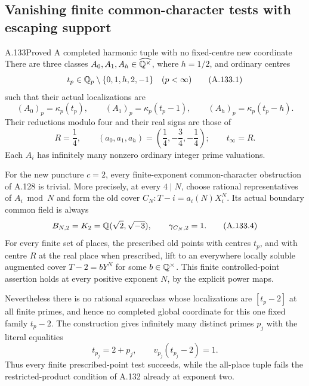 \subsection{Vanishing finite common-character tests with escaping support}

\begin{statement}{A.133}{Proved}
{A completed harmonic tuple with no fixed-centre new coordinate}
There are three classes \(A_0,A_1,A_h\in\widehat{\mathbb Q^\times}\),
where \(h=1/2\), and ordinary centres
\[
 t_p\in\mathbb Q_p\setminus\{0,1,h,2,-1\}
                         \quad(p<\infty)
\tag{A.133.1}
\]
such that their actual localizations are
\[
 (A_0)_p=\kappa_p(t_p),\qquad
 (A_1)_p=\kappa_p(t_p-1),\qquad
 (A_h)_p=\kappa_p(t_p-h).
\tag{A.133.2}
\]
Their reductions modulo four and their real signs are
those of
\[
       R=\frac14,\qquad
       (a_0,a_1,a_h)=\left(\frac14,-\frac34,-\frac14\right);
                  \qquad t_\infty=R.
\tag{A.133.3}
\]
Each \(A_i\) has infinitely many nonzero ordinary integer
prime valuations.

For the new puncture \(c=2\), every finite-exponent
common-character obstruction of A.128 is trivial.
More precisely, at every \(4\mid N\), choose rational
representatives of \(A_i\bmod N\) and form the old cover
\(C_N:T-i=a_i(N)X_i^N\).
Its actual boundary common field is always
\[
                  B_{N,2}=K_2=\mathbb Q(\sqrt2,\sqrt{-3}),
                    \qquad \gamma_{C_N,2}=1.
\tag{A.133.4}
\]
For every finite set of places, the prescribed old
points with centres \(t_p\), and with centre \(R\) at
the real place when prescribed, lift to an everywhere
locally soluble augmented cover
\(T-2=bY^N\) for some \(b\in\mathbb Q^\times\).
This finite controlled-point assertion holds at every
positive exponent \(N\), by the explicit power maps.

Nevertheless there is no rational squareclass whose
localizations are \([t_p-2]\) at all finite primes,
and hence no completed global coordinate for this
one fixed family \(t_p-2\).
The construction gives infinitely many distinct primes
\(p_j\) with the literal equalities
\[
                     t_{p_j}=2+p_j,\qquad
                     v_{p_j}(t_{p_j}-2)=1.
\tag{A.133.5}
\]
Thus every finite prescribed-point test succeeds,
while the all-place tuple fails the restricted-product
condition of A.132 already at exponent two.
\end{statement}
